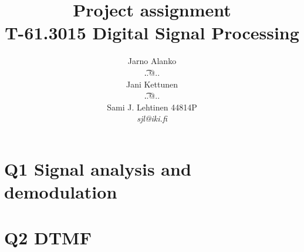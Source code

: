 \documentclass[a4paper]{article}
\begin{document}
\title{Project assignment \\
T-61.3015 Digital Signal Processing}
\author{Jarno Alanko \\
  {\t ..@..} \\
  Jani Kettunen \\
  {\t ..@..} \\
  Sami J. Lehtinen 44814P  \\ 
       {\it sjl@iki.fi}}

\maketitle             
\thispagestyle{empty}
\newpage
{}
\setcounter{page}{2}

\section*{Q1 Signal analysis and demodulation }


\section*{Q2 DTMF}


\clearpage



\end{document}
